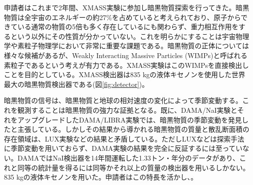 \documentclass[10pt,a4paper,twoside]{jarticle}
\newcommand{\研究課題名}{XMASS検出器を用いた季節変動による暗黒物質の直接探索}
\newcommand{\研究機関名}{神戸大学}
\newcommand{\申請者氏名}{岡直哉}
\newcommand{\研究代表者氏名}{\申請者氏名}
\newcommand{\研究期間の最終元号年度}{29}	%
\begin{document}
{申請者はこれまで2年間、XMASS実験に参加し暗黒物質探索を行ってきた。暗黒物質は全宇宙のエネルギーの約27\%を占めていると考えられており、原子からできている通常の物質の5倍も多く存在しているにも関わらず、重力相互作用をするという以外にその性質が分かっていない。これを明らかにすることは宇宙物理学や素粒子物理学において非常に重要な課題である。暗黒物質の正体については様々な候補があるが、Weakly Interacting Massive Particles (WIMPs)と呼ばれる素粒子であるという考えが有力である。XMASS実験はこのWIMPsを直接検出し{\bf \textcolor{red}{}}ことを目的としている。XMASS検出器は835 kgの液体キセノンを使用した世界最大の暗黒物質検出器である(図\ref{fig:detector})。\par
暗黒物質の信号は、暗黒物質と地球の相対速度の変化によって季節変動する。これを観測することは暗黒物質の強力な証拠となる。既に、DAMA/NaI実験とそれをアップグレードしたDAMA/LIBRA実験では、暗黒物質の季節変動を発見したと主張している\cite{DAMA}。しかしその結果から導かれる暗黒物質の質量と散乱断面積の存在領域は、LUX実験\cite{LUX}などの結果と矛盾している。ただしLUXなどは探索手法に季節変動を用いておらず、DAMA実験の結果を完全に反証するには至っていない。DAMAではNaI検出器を14年間運転した1.33トン・年分のデータがあり、これと同等の統計量を得るには同等かそれ以上の質量の検出器を用いるしかない。835 kgの液体キセノンを用いた{\bf \textcolor{red}{}}。申請者はこの特長を活かし、{\bf \textcolor{red}{}}。

}
\end{document}

